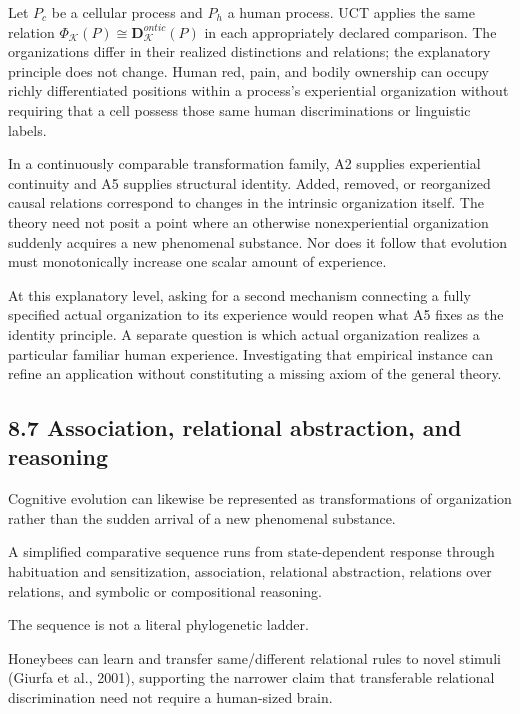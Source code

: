 \documentclass[
  11pt,
  a4paper,
]{article}
\begin{document}
Let \(P_c\) be a cellular process and \(P_h\) a human process. UCT
applies the same relation
\(\Phi_{\mathcal K}(P)\cong\mathbf D^{ontic}_{\mathcal K}(P)\) in each
appropriately declared comparison. The organizations differ in their
realized distinctions and relations; the explanatory principle does not
change. Human red, pain, and bodily ownership can occupy richly
differentiated positions within a process's experiential organization
without requiring that a cell possess those same human discriminations
or linguistic labels.

In a continuously comparable transformation family, A2 supplies
experiential continuity and A5 supplies structural identity. Added,
removed, or reorganized causal relations correspond to changes in the
intrinsic organization itself. The theory need not posit a point where
an otherwise nonexperiential organization suddenly acquires a new
phenomenal substance. Nor does it follow that evolution must
monotonically increase one scalar amount of experience.

At this explanatory level, asking for a second mechanism connecting a
fully specified actual organization to its experience would reopen what
A5 fixes as the identity principle. A separate question is which actual
organization realizes a particular familiar human experience.
Investigating that empirical instance can refine an application without
constituting a missing axiom of the general theory.

\hypertarget{association-relational-abstraction-and-reasoning}{%
\subsection{8.7 Association, relational abstraction, and
reasoning}\label{association-relational-abstraction-and-reasoning}}

Cognitive evolution can likewise be represented as transformations of
organization rather than the sudden arrival of a new phenomenal
substance.

A simplified comparative sequence runs from state-dependent response
through habituation and sensitization, association, relational
abstraction, relations over relations, and symbolic or compositional
reasoning.

The sequence is not a literal phylogenetic ladder.

Honeybees can learn and transfer same/different relational rules to
novel stimuli (Giurfa et al., 2001), supporting the narrower claim that
transferable relational discrimination need not require a human-sized
brain.
\end{document}
